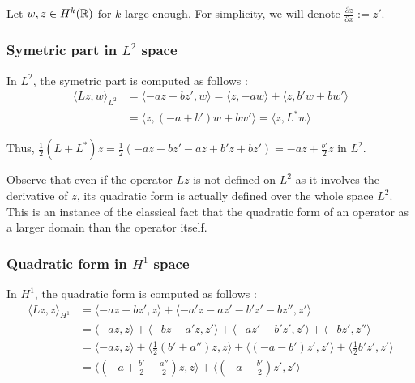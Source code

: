 \documentclass[11pt,a4paper]{article}
\begin{document}
Let $w,z \in H^k(\mathbb R)$ for $k$ large enough. For simplicity, we will denote $\frac{\partial z}{\partial x} := z'$.

\subsubsection{Symetric part in $L^2$ space}
In $L^2$, the symetric part is computed as follows :
\begin{align*}
  \langle Lz, w \rangle_{L^2}  &=   \langle -az - bz', w \rangle =  \langle z, -aw \rangle  +   \langle z, b'w+bw' \rangle    \\
                  &= \langle z, (-a+b')w + bw' \rangle = \langle z, L^*w \rangle
\end{align*}

Thus, $\frac{1}{2}(L+L^*)z = \frac{1}{2}(-az-bz' -az +b'z+bz') \displaystyle =-az+\frac{b'}{2}z$ in $L^2$.


\begin{rmq}
Observe that even if the operator $Lz$ is not defined on $L^2$ as it involves the derivative of $z$, its quadratic form is actually defined over the whole space $L^2$. This is an instance of the classical fact that the quadratic form of an operator as a larger domain than the operator itself.
\end{rmq}

\subsubsection{Quadratic form in $H^1$ space}
In $H^1$, the quadratic form is computed as follows :
\begin{align*}
  \langle Lz, z \rangle_{H^1}   &=   \langle -az - bz', z \rangle +  \langle -a'z-az' - b'z'-bz'', z' \rangle \\
  &=  \langle -az, z \rangle + \langle -bz - a'z, z' \rangle + \langle - az'-b'z', z' \rangle + \langle - bz', z'' \rangle \\
  &=  \langle -az, z \rangle + \langle \frac{1}{2}(b'+a'')z, z \rangle + \langle (-a-b')z', z' \rangle + \langle \frac{1}{2} b' z', z' \rangle \\
  &=  \langle (-a+ \frac{b'}{2}+\frac{a''}{2})z, z \rangle +  \langle (-a-\frac{b'}{2})z', z' \rangle 
\end{align*}
\end{document}
